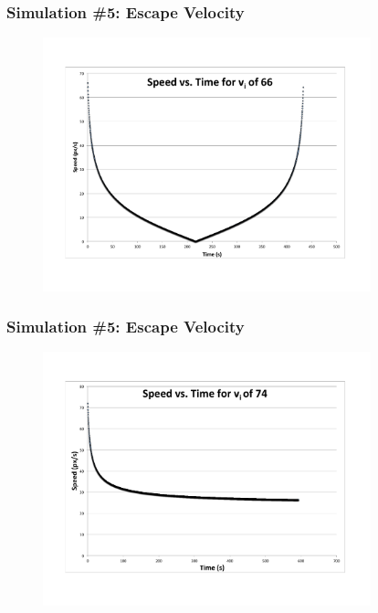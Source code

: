 \documentclass{beamer}
\begin{document}
\begin{frame}
\frametitle{Simulation \#5: Escape Velocity}

\begin{figure}[h] 
	\centering
		\includegraphics[width=9.5cm]{fig1.pdf}

	\label{fig:data1}
\end{figure}
\end{frame}


\begin{frame}
\frametitle{Simulation \#5: Escape Velocity}

\begin{figure}[h] 
	\centering
		\includegraphics[width=9.5cm]{fig2.pdf}

	\label{fig:data1}
\end{figure}
\end{frame}
\end{document}
